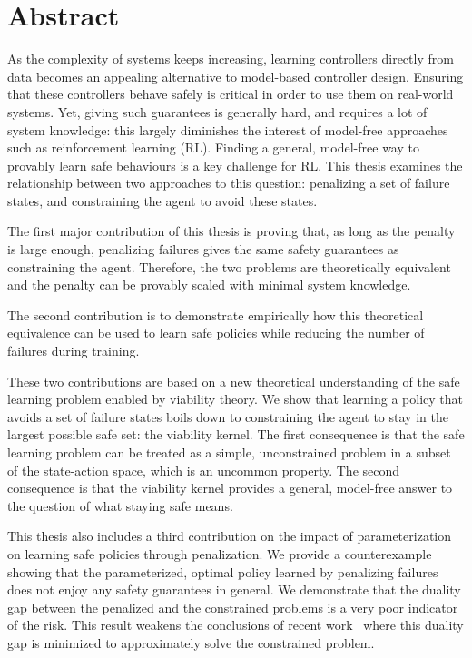 \chapter*{Abstract}

As the complexity of systems keeps increasing, learning controllers directly from data becomes an appealing alternative to model-based controller design. Ensuring that these controllers behave safely is critical in order to use them on real-world systems. Yet, giving such guarantees is generally hard, and requires a lot of system knowledge: this largely diminishes the interest of model-free approaches such as reinforcement learning (RL). Finding a general, model-free way to provably learn safe behaviours is a key challenge for RL. This thesis examines the relationship between two approaches to this question: penalizing a set of failure states, and constraining the agent to avoid these states.\par
The first major contribution of this thesis is proving that, as long as the penalty is large enough, penalizing failures gives the same safety guarantees as constraining the agent. Therefore, the two problems are theoretically equivalent and the penalty can be provably scaled with minimal system knowledge.\par
The second contribution is to demonstrate empirically how this theoretical equivalence can be used to learn safe policies while reducing the number of failures during training. \par
These two contributions are based on a new theoretical understanding of the safe learning problem enabled by viability theory. We show that learning a policy that avoids a set of failure states boils down to constraining the agent to stay in the largest possible safe set: the viability kernel. The first consequence is that the safe learning problem can be treated as a simple, unconstrained problem in a subset of the state-action space, which is an uncommon property. The second consequence is that the viability kernel provides a general, model-free answer to the question of what staying safe means.\par
This thesis also includes a third contribution on the impact of parameterization on learning safe policies through penalization. We provide a counterexample showing that the parameterized, optimal policy learned by penalizing failures does not enjoy any safety guarantees in general. We demonstrate that the duality gap between the penalized and the constrained problems is a very poor indicator of the risk. This result weakens the conclusions of recent work~\cite{paternain2019safe} where this duality gap is minimized to approximately solve the constrained problem.